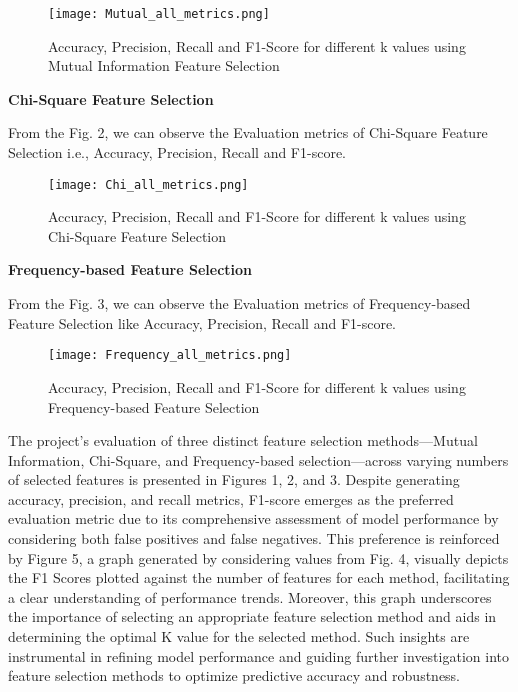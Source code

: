 \documentclass[acmlarge,nonacm,12pt]{acmart}
\begin{document}
\begin{figure}[h]
    \centering
    \texttt{[image: Mutual\_all\_metrics.png]}
    \caption{Accuracy, Precision, Recall and F1-Score for different k values using Mutual Information Feature Selection}
    \label{fig:enter-label}
\end{figure}
\textbf{Chi-Square Feature Selection}

From the Fig. 2, we can observe the Evaluation metrics of Chi-Square Feature Selection i.e., Accuracy, Precision, Recall and F1-score.

\begin{figure}[h]
    \centering
    \texttt{[image: Chi\_all\_metrics.png]}
    \caption{Accuracy, Precision, Recall and F1-Score for different k values using Chi-Square Feature Selection}
    \label{fig:enter-label}
\end{figure}


\textbf{Frequency-based Feature Selection}

From the Fig. 3, we can observe the Evaluation metrics of Frequency-based Feature Selection like Accuracy, Precision, Recall and F1-score.


\begin{figure}[h]
    \centering
    \texttt{[image: Frequency\_all\_metrics.png]}
    \caption{Accuracy, Precision, Recall and F1-Score for different k values using Frequency-based Feature Selection}
    \label{fig:enter-label}
\end{figure}



The project's evaluation of three distinct feature selection methods—Mutual Information, Chi-Square, and Frequency-based selection—across varying numbers of selected features is presented in Figures 1, 2, and 3. Despite generating accuracy, precision, and recall metrics, F1-score emerges as the preferred evaluation metric due to its comprehensive assessment of model performance by considering both false positives and false negatives. This preference is reinforced by Figure 5, a graph generated by considering values from Fig. 4, visually depicts the F1 Scores plotted against the number of features for each method, facilitating a clear understanding of performance trends. Moreover, this graph underscores the importance of selecting an appropriate feature selection method and aids in determining the optimal K value for the selected method. Such insights are instrumental in refining model performance and guiding further investigation into feature selection methods to optimize predictive accuracy and robustness.
\end{document}
